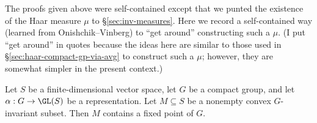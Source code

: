 \documentclass[reqno]{amsart} 
\begin{document}
The proofs given above were self-contained
except that we
punted the existence of the Haar measure $\mu$ to
\S\ref{sec:inv-measures}.
Here we record a self-contained way
(learned from Onishchik--Vinberg)
to ``get around''
constructing such a $\mu$.
(I put ``get around'' in quotes because
the ideas here are similar to
those used
in \S\ref{sec:haar-compact-gp-via-avg}
to construct such a $\mu$; however, they are somewhat simpler in the present context.)
\begin{theorem}\label{thm:fixed-point-theorem-for-affine-actions-of-compact-groups}
  Let $S$ be a finite-dimensional vector space, let $G$ be a
  compact group, and let $\alpha : G \rightarrow \GL(S)$ be a
  representation.  Let $M \subseteq S$ be a nonempty convex
  $G$-invariant subset.  Then $M$ contains a fixed point of $G$.
\end{theorem}
\end{document}
